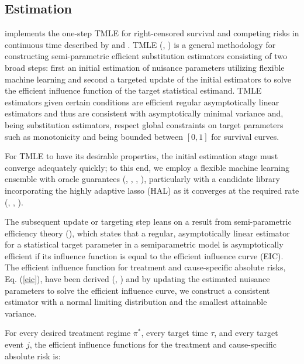 \documentclass{report}
\newcommand{\1}{\ensuremath{\mathbf{1}}}
\newcommand{\trt}{\ensuremath{\pi^*}}
\newcommand{\tk}{\ensuremath{\tau}}
\newcommand{\jj}{\ensuremath{j}}
\begin{document}
\subsection{Estimation}
\label{sec:org6c604c9}
 implements the one-step TMLE for right-censored survival and competing risks in continuous time described by \cite{rytgaard_continuous-time_2021} and \cite{rytgaard_one-step_2021}. TMLE (\cite{laan_statistical_2006}, \cite{laan_targeted_2011}) is a general methodology for constructing semi-parametric efficient substitution estimators consisting of two broad steps: first an initial estimation of nuisance parameters utilizing flexible machine learning and second a targeted update of the initial estimators to solve the efficient influence function of the target statistical estimand. TMLE estimators given certain conditions are efficient regular asymptotically linear estimators and thus are consistent with asymptotically minimal variance and, being substitution estimators, respect global constraints on target parameters such as monotonicity and being bounded between \([0, 1]\) for survival curves.

For TMLE to have its desirable properties, the initial estimation stage must converge adequately quickly; to this end, we employ a flexible machine learning ensemble with oracle guarantees (\cite{laan_super_2007}, \cite{polley_superlearner_2021}, \cite{laan_unified_2003}, \cite{vaart_oracle_2006}), particularly with a candidate library incorporating the highly adaptive lasso (HAL) as it converges at the required rate (\cite{laan_generally_2017}, \cite{benkeser_highly_2016}, \cite{rytgaard_continuous-time_2021}). 

The subsequent update or targeting step leans on a result from semi-parametric efficiency theory (\cite{bickel_efficient_1998}), which states that a regular, asymptotically linear estimator for a statistical target parameter in a semiparametric model is asymptotically efficient if its influence function is equal to the efficient influence curve (EIC). The efficient influence function for treatment and cause-specific absolute risks, Eq. (\ref{eic}), have been derived (\cite{rytgaard_continuous-time_2021}, \cite{rytgaard_one-step_2021}) and by updating the estimated nuisance parameters to solve the efficient influence curve, we construct a consistent estimator with a normal limiting distribution and the smallest attainable variance. 

For every desired treatment regime \(\trt\), every target time \tk, and every target event \jj, the efficient influence functions for the treatment and cause-specific absolute risk is: 
\end{document}
